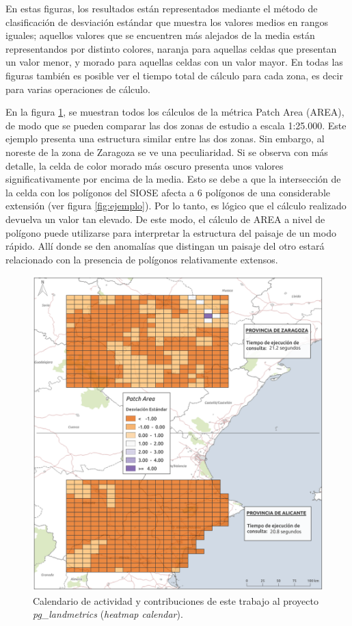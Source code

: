 En estas figuras, los resultados están representados mediante el método de clasificación de desviación estándar que muestra los valores medios en rangos iguales; aquellos valores que se encuentren más alejados de la media están representandos por distinto colores, naranja para aquellas celdas que presentan un valor menor, y morado para aquellas celdas con un valor mayor. En todas las figuras también es posible ver el tiempo total de cálculo para cada zona, es decir para varias operaciones de cálculo.

En la figura \ref{fig:p_25}, se muestran todos los cálculos de la métrica Patch Area (AREA), de modo que se pueden comparar las dos zonas de estudio a escala 1:25.000. Este ejemplo presenta una estructura similar entre las dos zonas. Sin embargo, al noreste de la zona de Zaragoza se ve una peculiaridad. Si se observa con más detalle, la celda de color morado más oscuro presenta unos valores significativamente por encima de la media. Esto se debe a que la intersección de la celda con los polígonos del SIOSE afecta a 6 polígonos de una considerable extensión (ver figura \ref{fig:ejemplo}). Por lo tanto, es lógico que el cálculo realizado devuelva un valor tan elevado. De este modo, el cálculo de AREA a nivel de polígono puede utilizarse para interpretar la estructura del paisaje de un modo rápido. Allí donde se den anomalías que distingan un paisaje del otro estará relacionado con la presencia de polígonos relativamente extensos.

\begin{figure}
\begin{center}
\includegraphics[width=\textwidth]{ResultadosyDiscusion/Figs/Results/p_25.png}
\caption{Calendario de actividad y contribuciones de este trabajo al proyecto \textit{pg\_landmetrics} (\textit{heatmap calendar}). \label{fig:p_25}}
\end{center}
\end{figure}


